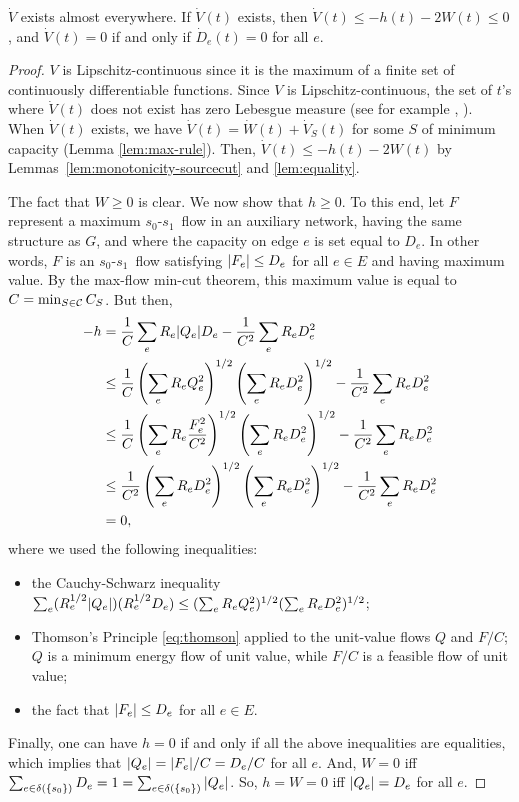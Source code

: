 \documentclass[11pt,a4paper]{article}
\renewcommand{\source}{\ensuremath{s_0}}
\renewcommand{\sink}{\ensuremath{s_1}}
\begin{document}
\begin{lemma}
\label{lem:lyapunov}
$\dot{V}$ exists almost everywhere. 
If $\dot{V}(t)$ exists, then $\dot{V}(t) \le -h(t) -2W(t) \le 0$, and
$\dot{V}(t)=0$ if and only if $\dot{D}_e(t)=0$ for all $e$. 
\end{lemma}
\begin{proof}
$V$ is Lipschitz-continuous since it is the maximum of a finite set of
continuously differentiable functions. Since $V$ is Lipschitz-continuous, the
set of $t$'s where $\dot{V}(t)$ does not exist has zero Lebesgue measure (see
for example \cite[Ch.~3]{Clarke:1998}, \cite[Ch.~3]{Makela:1992}). When
$\dot{V}(t)$ exists, we have $\dot{V}(t) = \dot{W}(t)+\dot{V}_S(t)$ for some
$S$ of minimum capacity (Lemma \ref{lem:max-rule}). 
Then, $\dot{V}(t) \le -h(t) - 2W(t)$ by Lemmas~\ref{lem:monotonicity-sourcecut}
and \ref{lem:equality}.  

The fact that $W \ge 0$ is clear. We now show that $h \ge 0$. To this end, let
$F$ represent a maximum \source-\sink\ flow in an auxiliary network, having the
same structure as $G$, and where the capacity on edge $e$ is set equal to
$D_e$. In other words, $F$ is an \source-\sink\ flow satisfying $| F_e | \le
D_e$ for all $e \in E$ and having maximum value. By the max-flow min-cut
theorem, this maximum value is equal to $C = \min_{S \in {\cal C}} C_S$.   
But then, 
\begin{align*}
-h &= \frac{1}{C} \sum_e R_e | Q_e | D_e  - \frac{1}{C^2} \sum_{e} R_{e} D_{e}^2 \\
&\le \frac{1}{C} \left(\sum_e R_e Q_e^2 \right)^{1/2} \left( \sum_e R_e D_e^2 \right)^{1/2} - \frac{1}{C^2} \sum_e R_e D_e^2 \\
&\le \frac{1}{C} \left( \sum_e R_e \frac{F_e^2}{C^2} \right)^{1/2} \left( \sum_e R_e D_e^2 \right)^{1/2} - \frac{1}{C^2} \sum_e R_e D_e^2 \\
&\le \frac{1}{C^2} \left( \sum_e R_e D_e^2 \right)^{1/2} \left( \sum_e R_e
D_e^2 \right)^{1/2} - \frac{1}{C^2} \sum_e R_e D_e^2 \\
&= 0, 
\end{align*}
where we used the following inequalities:
\begin{itemize}
\item[-] the Cauchy-Schwarz inequality $\sum_e (R_e^{1/2} | Q_e |) (R_e^{1/2} D_e) \le (\sum_e R_e Q_e^2)^{1/2} (\sum_e R_e D_e^2)^{1/2}$;
\item[-] Thomson's Principle \eqref{eq:thomson} applied to the unit-value flows $Q$ and $F/C$; $Q$ is a minimum energy flow of unit value, while $F/C$ is a feasible flow of unit value; 
\item[-] the fact that $| F_e | \le D_e$ for all $e \in E$.  
\end{itemize}

Finally, one can have $h=0$ if and only if all the above inequalities are
equalities, which implies that $| Q_e |=| F_e |/C=D_e/C$ for all $e$. And,
$W=0$ iff $\sum_{e \in \delta(\{s_0\})} D_e = 1 = \sum_{e \in \delta(\{s_0\})}
| Q_e |$. So, $h=W=0$ iff $| Q_e |=D_e$ for all $e$.   
\end{proof}
\end{document}
